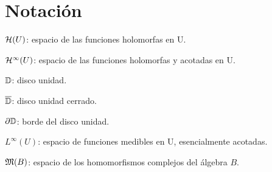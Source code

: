 \chapter{Notación}
\label{ap:notacion}

$\mathcal{H}(U)$: espacio de las funciones holomorfas en U.

$\mathcal{H}^{\infty}(U)$: espacio de las funciones holomorfas y acotadas en U.

$\mathbb{D}$: disco unidad.

$\overline{\mathbb{D}}$: disco unidad cerrado.

$\partial \mathbb{D}$: borde del disco unidad.

$L^{\infty}(U)$: espacio de funciones medibles en U, esencialmente acotadas.

$\mathfrak{M} (B)$: espacio de los homomorfismos complejos del álgebra $B$.
